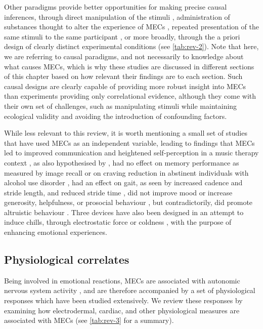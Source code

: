 Other paradigms provide better opportunities for making precise causal inferences, through direct manipulation of the stimuli \parencite{bannister2018, bannister2020b, honda2020, juslin2014, park2019}, administration of substances thought to alter the experience of MECs \parencite{ferreri2019, goldstein1980, starcke2019}, repeated presentation of the same stimuli to the same participant \parencite{grewe2007}, or more broadly, through the a priori design of clearly distinct experimental conditions (see \autoref{tab:rev-2}). Note that here, we are referring to causal paradigms, and not necessarily to knowledge about what causes MECs, which is why these studies are discussed in different sections of this chapter based on how relevant their findings are to each section. Such causal designs are clearly capable of providing more robust insight into MECs than experiments providing only correlational evidence, although they come with their own set of challenges, such as manipulating stimuli while maintaining ecological validity and avoiding the introduction of confounding factors.

While less relevant to this review, it is worth mentioning a small set of studies that have used MECs as an independent variable, leading to findings that MECs led to improved communication and heightened self-perception in a music therapy context \parencite{lee2008}, as also hypothesised by \textcite{tihanyi2016}, had no effect on memory performance as measured by image recall \parencite{carr2016} or on craving reduction in abstinent individuals with alcohol use disorder \parencite{mathis2017}, had an effect on gait, as seen by increased cadence and stride length, and reduced stride time \parencite{park2019}, did not improve mood or increase generosity, helpfulness, or prosocial behaviour \parencite{konecni2007b}, but contradictorily, did promote altruistic behaviour \parencite{fukui2014}. Three devices have also been designed in an attempt to induce chills, through electrostatic force \parencite{fukushima2012} or coldness \parencite{ishikawa2019, schoeller2019b}, with the purpose of enhancing emotional experiences.



\subsection{Physiological correlates}
\label{se:rev-results-4}

Being involved in emotional reactions, MECs are associated with autonomic nervous system activity \parencite{kreibig2010}, and are therefore accompanied by a set of physiological responses which have been studied extensively. We review these responses by examining how electrodermal, cardiac, and other physiological measures are associated with MECs (see \autoref{tab:rev-3} for a summary).

